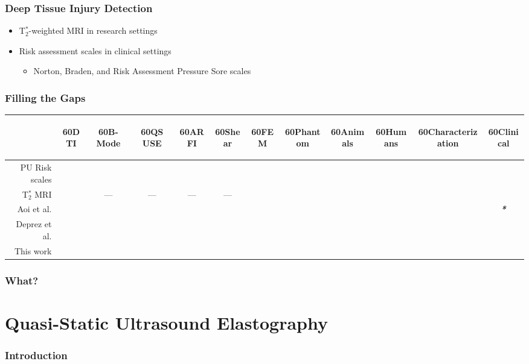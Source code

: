 \documentclass{beamer}
\newcommand{\rotHead}[1]{\begin{rotate}{60}#1\end{rotate}}
\newcommand{\cmark}{\color{ExecusharesBlue}\ding{51}}
\newcommand{\xmark}{\color{ExecusharesRed}\ding{55}}
\begin{document}
		\begin{frame}
			\frametitle{Deep Tissue Injury Detection}
			\begin{itemize}
				\item T$_2^*$-weighted MRI in research settings
				\item Risk assessment scales in clinical settings
				\begin{itemize}
					\item Norton, Braden, and Risk Assessment Pressure Sore scales
				\end{itemize}
			\end{itemize}
		\end{frame}

		\begin{frame}
			\frametitle{Filling the Gaps}
			\begin{center}
				\vspace{1cm}
				\begin{tabular}{r|ccccccccccc}
					& \rotHead{DTI} & \rotHead{B-Mode} & \rotHead{QS USE} & \rotHead{ARFI} & \rotHead{Shear} & \rotHead{FEM} & \rotHead{Phantom} & \rotHead{Animals} & \rotHead{Humans} & \rotHead{Characterization} & \rotHead{Clinical} \\
					\hline
					PU Risk scales & \xmark & \xmark & \xmark & \xmark & \xmark & \xmark & \xmark & \xmark & \cmark & \xmark & \cmark \\
					T$_2^*$ MRI & \cmark & --- & --- & --- & --- & \cmark & \cmark & \cmark& \cmark & \xmark & \xmark \\
					Aoi et al. & \cmark & \cmark & \xmark & \xmark & \xmark & \xmark & \xmark & \xmark & \cmark & \xmark & \cmark\emph{\textbf{*}} \\
					Deprez et al. & \cmark & \xmark & \cmark & \xmark & \xmark & \cmark & \cmark & \cmark & \xmark & \xmark & \cmark \\
					This work & \cmark & \xmark & \cmark & \cmark & \cmark & \cmark & \cmark & \xmark & \xmark & \cmark & \cmark \\
				\end{tabular}
			\end{center}
		\end{frame}

		\begin{frame}
			\frametitle{What?}
		\end{frame}

	\section[QS USE]{Quasi-Static Ultrasound Elastography}
		\begin{frame}
			\frametitle{Introduction}
		\end{frame}
\end{document}
